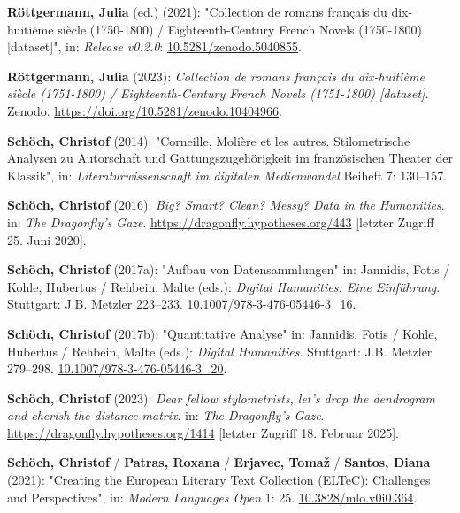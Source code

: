 \documentclass[
  12pt,
  letterpaper,
  DIV=11,
  numbers=noendperiod]{scrreprt}
\newlength{\cslhangindent}
\newenvironment{CSLReferences}[2] %
 {\begin{list}{}{%
  \setlength{\itemindent}{0pt}
  \setlength{\leftmargin}{0pt}
  \setlength{\parsep}{0pt}
  \ifodd #1
   \setlength{\leftmargin}{\cslhangindent}
   \setlength{\itemindent}{-1\cslhangindent}
  \fi
  \setlength{\itemsep}{#2\baselineskip}}}
 {\end{list}}
\begin{document}
\begin{CSLReferences}{1}{0}
\textbf{Röttgermann, Julia} (ed.) (2021): "Collection de romans français
du dix-huitième siècle (1750-1800) / {Eighteenth}-{Century} {French}
{Novels} (1750-1800) {[}dataset{]}", in: \emph{Release v0.2.0}:
\href{https://doi.org/10.5281/zenodo.5040855}{10.5281/zenodo.5040855}.

\textbf{Röttgermann, Julia} (2023): \emph{Collection de romans français
du dix-huitième siècle (1751-1800) / {Eighteenth}-{Century} {French}
{Novels} (1751-1800) {[}dataset{]}}. Zenodo.
\url{https://doi.org/10.5281/zenodo.10404966}.

\textbf{Schöch, Christof} (2014): "Corneille, {Molière} et les autres.
{Stilometrische} {Analysen} zu {Autorschaft} und {Gattungszugehörigkeit}
im französischen {Theater} der {Klassik}", in:
\emph{Literaturwissenschaft im digitalen Medienwandel} Beiheft 7:
130--157.

\textbf{Schöch, Christof} (2016): \emph{Big? {Smart}? {Clean}? {Messy}?
{Data} in the {Humanities}}. in: \emph{The Dragonfly's Gaze}.
\url{https://dragonfly.hypotheses.org/443} {[}letzter Zugriff 25. Juni
2020{]}.

\textbf{Schöch, Christof} (2017a): "Aufbau von {Datensammlungen}" in:
Jannidis, Fotis / Kohle, Hubertus / Rehbein, Malte (eds.): \emph{Digital
{Humanities}: {Eine} {Einführung}}. Stuttgart: J.B. Metzler 223--233.
\href{https://doi.org/10.1007/978-3-476-05446-3_16}{10.1007/978-3-476-05446-3\_16}.

\textbf{Schöch, Christof} (2017b): "Quantitative {Analyse}" in:
Jannidis, Fotis / Kohle, Hubertus / Rehbein, Malte (eds.): \emph{Digital
{Humanities}}. Stuttgart: J.B. Metzler 279--298.
\href{https://doi.org/10.1007/978-3-476-05446-3_20}{10.1007/978-3-476-05446-3\_20}.

\textbf{Schöch, Christof} (2023): \emph{Dear fellow stylometrists, let's
drop the dendrogram and cherish the distance matrix}. in: \emph{The
Dragonfly's Gaze}. \url{https://dragonfly.hypotheses.org/1414}
{[}letzter Zugriff 18. Februar 2025{]}.

\textbf{Schöch, Christof} / \textbf{Patras, Roxana} / \textbf{Erjavec,
Tomaž} / \textbf{Santos, Diana} (2021): "Creating the {European}
{Literary} {Text} {Collection} ({ELTeC}): {Challenges} and
{Perspectives}", in: \emph{Modern Languages Open} 1: 25.
\href{https://doi.org/10.3828/mlo.v0i0.364}{10.3828/mlo.v0i0.364}.


\end{CSLReferences}
\end{document}
